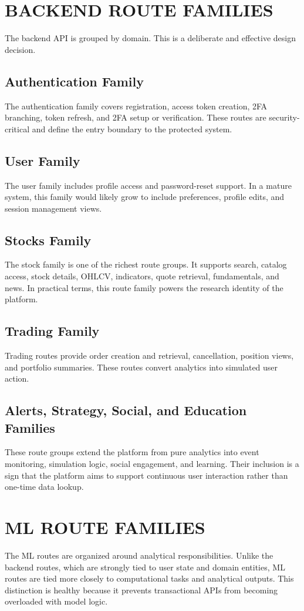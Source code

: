 \documentclass[12pt,a4paper]{report}
\begin{document}
\section{BACKEND ROUTE FAMILIES}
The backend API is grouped by domain. This is a deliberate and effective design decision.

\subsection{Authentication Family}
The authentication family covers registration, access token creation, 2FA branching, token refresh, and 2FA setup or verification. These routes are security-critical and define the entry boundary to the protected system.

\subsection{User Family}
The user family includes profile access and password-reset support. In a mature system, this family would likely grow to include preferences, profile edits, and session management views.

\subsection{Stocks Family}
The stock family is one of the richest route groups. It supports search, catalog access, stock details, OHLCV, indicators, quote retrieval, fundamentals, and news. In practical terms, this route family powers the research identity of the platform.

\subsection{Trading Family}
Trading routes provide order creation and retrieval, cancellation, position views, and portfolio summaries. These routes convert analytics into simulated user action.

\subsection{Alerts, Strategy, Social, and Education Families}
These route groups extend the platform from pure analytics into event monitoring, simulation logic, social engagement, and learning. Their inclusion is a sign that the platform aims to support continuous user interaction rather than one-time data lookup.

\section{ML ROUTE FAMILIES}
The ML routes are organized around analytical responsibilities. Unlike the backend routes, which are strongly tied to user state and domain entities, ML routes are tied more closely to computational tasks and analytical outputs. This distinction is healthy because it prevents transactional APIs from becoming overloaded with model logic.
\end{document}
